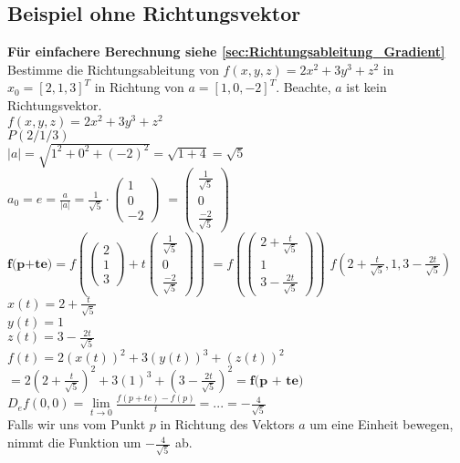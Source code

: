 \documentclass[../main.tex]{subfiles}
\begin{document}
\subsection{Beispiel ohne Richtungsvektor}
\textbf{Für einfachere Berechnung siehe \hyperref[sec:Richtungsableitung_Gradient]{\ref{sec:Richtungsableitung_Gradient} }}
Bestimme die Richtungsableitung von $f(x,y,z)=2x^2+3y^3+z^2$ in $x_0=[2,1,3]^T$ in Richtung von
$a=[1,0,-2]^T$. Beachte, $a$ ist kein Richtungsvektor. \\ [7pt]
$f(x,y,z)=2x^2+3y^3+z^2$ \\ [7pt]
$P(2/1/3)$ \\ [7pt]
$|a|=\sqrt{1^2+0^2+(-2)^2}=\sqrt{1+4}=\sqrt{5}$ \\ [7pt]
$a_0=e=\frac{a}{|a|}=\frac{1}{\sqrt{5}}\cdot\begin{pmatrix}1\\0\\-2\end{pmatrix}$ 
$=\begin{pmatrix}\frac{1}{\sqrt{5}}\\0\\\frac{-2}{\sqrt{5}}\end{pmatrix} $\\ [7pt]
$\textbf{f(p+te)}=f\left(\begin{pmatrix}2\\1\\3\end{pmatrix}+t\begin{pmatrix}\frac{1}{\sqrt{5}}\\0\\\frac{-2}{\sqrt{5}}\end{pmatrix}\right)$
$=f\left(\begin{pmatrix}2+\frac{t}{\sqrt{5}}\\1\\3-\frac{2t}{\sqrt{5}}\end{pmatrix}\right)$ 
$f(2+\frac{t}{\sqrt{5}},1,3-\frac{2t}{\sqrt{5}})$ \\ [7pt]
$x(t)=2+\frac{t}{\sqrt{5}}$ \\ [7pt]
$y(t)=1$ \\ [7pt]
$z(t)=3-\frac{2t}{\sqrt{5}}$ \\ [7pt]
$f(t) = 2(x(t))^2+3(y(t))^3+(z(t))^2$
$=2(2+\frac{t}{\sqrt{5}})^2+3(1)^3+(3-\frac{2t}{\sqrt{5}})^2 = \textbf{f(p + te)}$ \\
$D_ef(0,0)=\lim\limits_{t \to 0}\frac{f(p+te)-f(p)}{t}=...=-\frac{4}{\sqrt{5}}$ \\ [7pt]
Falls wir uns vom Punkt $p$ in Richtung des Vektors $a$ um eine Einheit bewegen, nimmt die
Funktion um $-\frac{4}{\sqrt{5}}$ ab.
\end{document}
